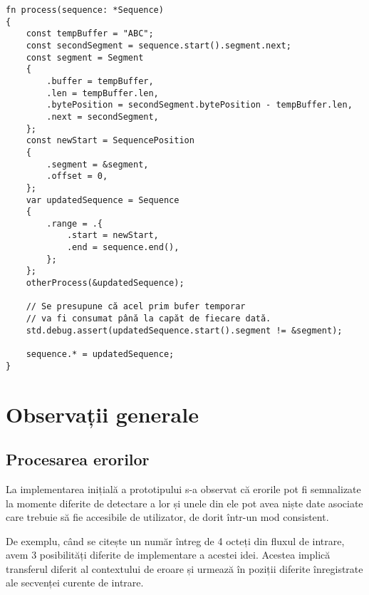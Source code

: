 \documentclass[a4paper,12pt]{report}
\begin{document}
\begin{verbatim}
fn process(sequence: *Sequence)
{
    const tempBuffer = "ABC";
    const secondSegment = sequence.start().segment.next;
    const segment = Segment
    {
        .buffer = tempBuffer,
        .len = tempBuffer.len,
        .bytePosition = secondSegment.bytePosition - tempBuffer.len,
        .next = secondSegment,
    };
    const newStart = SequencePosition
    {
        .segment = &segment,
        .offset = 0,
    };
    var updatedSequence = Sequence
    {
        .range = .{
            .start = newStart,
            .end = sequence.end(),
        };
    };
    otherProcess(&updatedSequence);

    // Se presupune că acel prim bufer temporar
    // va fi consumat până la capăt de fiecare dată.
    std.debug.assert(updatedSequence.start().segment != &segment);

    sequence.* = updatedSequence;
}
\end{verbatim}


\section{Observații generale}

\subsection{Procesarea erorilor}

La implementarea inițială a prototipului s-a observat că erorile pot fi semnalizate
la momente diferite de detectare a lor și unele din ele pot avea niște date asociate
care trebuie să fie accesibile de utilizator, de dorit într-un mod consistent.

De exemplu, când se citește un număr întreg de 4 octeți din fluxul de intrare,
avem 3 posibilități diferite de implementare a acestei idei.
Acestea implică transferul diferit al contextului de eroare și
urmează în poziții diferite înregistrate ale secvenței curente de intrare.
\end{document}
